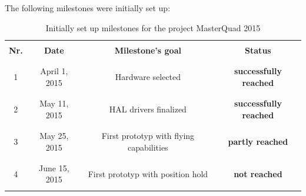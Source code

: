 The following milestones were initially set up:
\begin{table}[H]	
	\begin{tabular}{|c|c|c|c|}
\hline
&&&\\
\textbf{Nr.} & \textbf{Date} & \textbf{Milestone's goal} & \textbf{Status}\\
&&&\\
\hhline{|=|=|=|=|}
&&&\\
	1 & April 1, 2015 & Hardware selected & \textcolor[rgb]{0,0.58,0}{\textbf{successfully reached}}\\
	&&&\\
\hline
&&&\\
				2 & May 11, 2015 & HAL drivers finalized& \textcolor[rgb]{0,0.58,0}{\textbf{successfully reached}}\\
				&&&\\
\hline
&&&\\
				3 & May 25, 2015&First prototyp with flying capabilities& \textcolor[rgb]{1,0.41,0.13}{\textbf{partly reached}}\\
				&&&\\
\hline
&&&\\
				4 & June 15, 2015& First prototyp with position hold &\textcolor[rgb]{1,0,0}{\textbf{not reached}}\\
				&&&\\
\hline
	\end{tabular}
	\caption{Initially set up milestones for the project MasterQuad 2015}
	\label{tab:projGoals:milestones}
\end{table}


